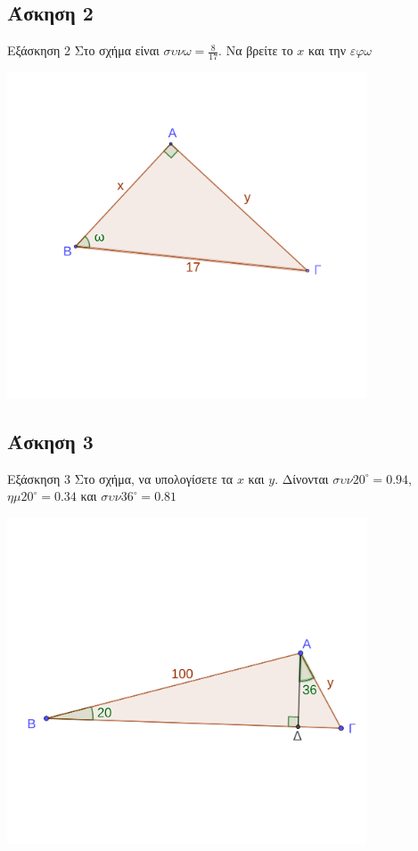 \documentclass[greek]{beamer}
\begin{document}
\subsection{Άσκηση 2}
\begin{frame}[label=Άσκηση2]{Εξάσκηση 2}
 Στο σχήμα είναι $συνω=\frac{8}{17}$. Να βρείτε το $x$ και την $εφω$

 \centering
 \includegraphics[width=0.8\textwidth]{"./images/3.1.1_2.png"}


\end{frame}

\subsection{Άσκηση 3}
\begin{frame}[label=Άσκηση3]{Εξάσκηση 3}
 Στο σχήμα, να υπολογίσετε τα $x$ και $y$. Δίνονται $συν20^{\circ}=0.94$, $ημ20^{\circ}=0.34$ και $συν36^{\circ}=0.81$

 \centering
 \includegraphics[width=0.8\textwidth]{"./images/3.1.1_3.png"}

\end{frame}
\end{document}
